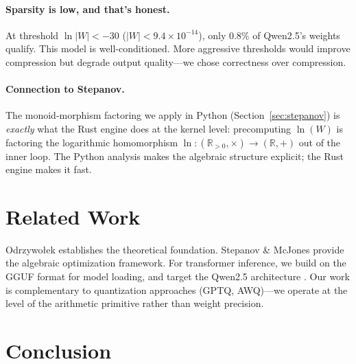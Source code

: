 \documentclass[acmsmall,nonacm]{acmart}
\begin{document}
\paragraph{Sparsity is low, and that's honest.}
At threshold $\ln|W| < -30$ ($|W| < 9.4 \times 10^{-14}$), only 0.8\%
of Qwen2.5's weights qualify.  This model is well-conditioned.  More
aggressive thresholds would improve compression but degrade output
quality---we chose correctness over compression.

\paragraph{Connection to Stepanov.}
The monoid-morphism factoring we apply in Python (Section~\ref{sec:stepanov})
is \emph{exactly} what the Rust engine does at the kernel level:
precomputing $\ln(W)$ is factoring the logarithmic homomorphism
$\ln\colon(\mathbb{R}_{>0},\times) \to (\mathbb{R},+)$ out of the
inner loop.  The Python analysis makes the algebraic structure explicit;
the Rust engine makes it fast.


\section{Related Work}
\label{sec:related}

Odrzywołek \cite{odrzywołek2026} establishes the theoretical foundation.
Stepanov \& McJones \cite{stepanov2009} provide the algebraic
optimization framework.  For transformer inference, we build on the GGUF
format \cite{gguf} for model loading, and target the Qwen2.5
architecture \cite{qwen2.5}.  Our work is complementary to quantization
approaches (GPTQ, AWQ)---we operate at the level of the arithmetic
primitive rather than weight precision.


\section{Conclusion}
\label{sec:conclusion}
\end{document}
